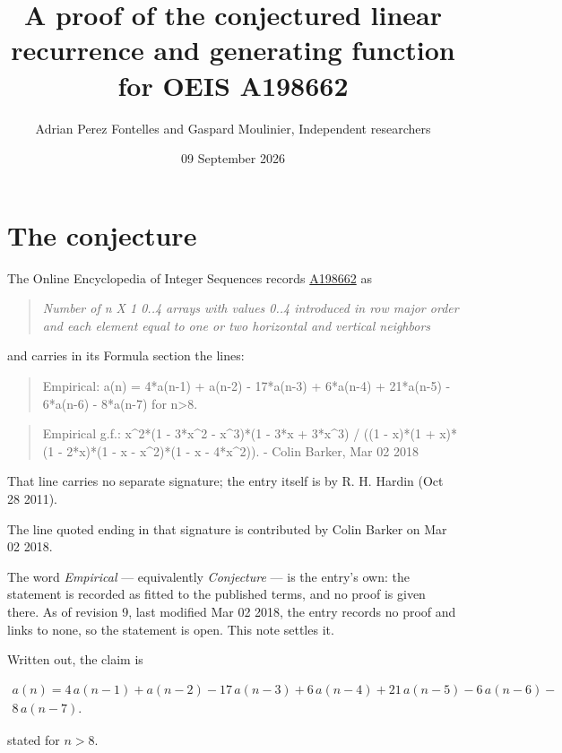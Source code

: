 \documentclass[11pt]{article}
\title{A proof of the conjectured linear recurrence and generating function for OEIS A198662}
\author{Adrian Perez Fontelles and Gaspard Moulinier, Independent researchers}
\date{09 September 2026}
\theoremstyle{definition}
\begin{document}
\maketitle
\section{The conjecture}

The Online Encyclopedia of Integer Sequences records \href{https://oeis.org/A198662}{A198662} as

\begin{quote}\itshape Number of n X 1 0..4 arrays with values 0..4 introduced in row major order and each element equal to one or two horizontal and vertical neighbors\end{quote}

and carries in its Formula section the lines:

\begin{quote}\ttfamily Empirical: a(n) = 4*a(n-1) + a(n-2) - 17*a(n-3) + 6*a(n-4) + 21*a(n-5) - 6*a(n-6) - 8*a(n-7) for n>8.\end{quote}

\begin{quote}\ttfamily Empirical g.f.: x\textasciicircum{}2*(1 - 3*x\textasciicircum{}2 - x\textasciicircum{}3)*(1 - 3*x + 3*x\textasciicircum{}3) / ((1 - x)*(1 + x)*(1 - 2*x)*(1 - x - x\textasciicircum{}2)*(1 - x - 4*x\textasciicircum{}2)). - Colin Barker, Mar 02 2018\end{quote}

That line carries no separate signature; the entry itself is by R. H. Hardin (Oct 28 2011).

The line quoted ending in that signature is contributed by Colin Barker on Mar 02 2018.

The word {\itshape Empirical} --- equivalently {\itshape Conjecture} --- is the entry's own: the statement is recorded as fitted to the published terms, and no proof is given there. As of revision 9, last modified Mar 02 2018, the entry records no proof and links to none, so the statement is open. This note settles it.

Written out, the claim is

\begin{multline*} a(n) = 4\,a(n-1) + a(n-2) - 17\,a(n-3) + 6\,a(n-4) + 21\,a(n-5) - 6\,a(n-6) - \\ 8\,a(n-7). \end{multline*}

stated for $n > 8$.
\end{document}
